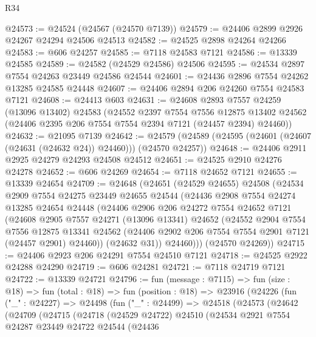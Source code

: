 \begin{lexlean}{R34}
\begin{coremodule}
@24573 := @24524 (@24567 (@24570 @7139))
@24579 := @24406 @2899 @2926 @24267 @24294 @24506 @24513
@24582 := @24525 @2898 @24264 @24266
@24583 := @606 @24257
@24585 := @7118 @24583 @7121
@24586 := @13339 @24585
@24589 := @24582 (@24529 @24586) @24506
@24595 := @24534 @2897 @7554 @24263 @23449 @24586 @24544
@24601 := @24436 @2896 @7554 @24262 @13285 @24585 @24448
@24607 := @24406 @2894 @206 @24260 @7554 @24583 @7121
@24608 := @24413 @603
@24631 := @24608
    @2893
    @7557
    @24259
    (@13096 @13402)
    @24583
    (@24552
      @2397
      @7554
      @7556
      @12875
      @13402
      @24562
      (@24406 @2395 @206 @7554 @7554 @2394 @7121 (@24457 @2394) @24460))
@24632 := @21095 @7139
@24642 := @24579 (@24589 (@24595 (@24601 (@24607 (@24631 (@24632 @24)) @24460))) (@24570 @24257))
@24648 := @24406 @2911 @2925 @24279 @24293 @24508 @24512
@24651 := @24525 @2910 @24276 @24278
@24652 := @606 @24269
@24654 := @7118 @24652 @7121
@24655 := @13339 @24654
@24709 := @24648
    (@24651
      (@24529 @24655)
      @24508
      (@24534
        @2909
        @7554
        @24275
        @23449
        @24655
        @24544
        (@24436
          @2908
          @7554
          @24274
          @13285
          @24654
          @24448
          (@24406
            @2906
            @206
            @24272
            @7554
            @24652
            @7121
            (@24608
              @2905
              @7557
              @24271
              (@13096 @13341)
              @24652
              (@24552
                @2904
                @7554
                @7556
                @12875
                @13341
                @24562
                (@24406 @2902 @206 @7554 @7554 @2901 @7121 (@24457 @2901) @24460))
              (@24632 @31))
            @24460)))
      (@24570 @24269))
@24715 := @24406 @2923 @206 @24291 @7554 @24510 @7121
@24718 := @24525 @2922 @24288 @24290
@24719 := @606 @24281
@24721 := @7118 @24719 @7121
@24722 := @13339 @24721
@24796 := fun (message : @7115) =>
  fun (size : @18) =>
  fun (total : @18) =>
  fun (position : @18) =>
  @23916
    (@24226
      (fun ("_" : @24227) =>
      @24498
        (fun ("_" : @24499) =>
        @24518
          (@24573
            (@24642
              (@24709
                (@24715
                  (@24718
                    (@24529 @24722)
                    @24510
                    (@24534
                      @2921
                      @7554
                      @24287
                      @23449
                      @24722
                      @24544
                      (@24436

\end{coremodule}
\end{lexlean}
